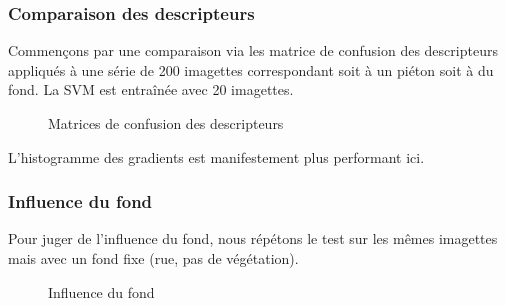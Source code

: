 \documentclass{article}
\begin{document}
	\subsubsection{Comparaison des  descripteurs}	
	\label{sec:desccomp}
	Commençons par une comparaison via les matrice de confusion des descripteurs appliqués à une série de 200 imagettes correspondant soit à un piéton soit à du fond. La SVM est entraînée avec 20 imagettes.
	
	\begin{figure}[h]
		\centering
		\hfill
		\caption{Matrices de confusion des descripteurs}
	\end{figure}
	
	L'histogramme des gradients est manifestement plus performant ici.
	
	\subsubsection{Influence du fond}
	Pour juger de l'influence du fond, nous répétons le test sur les mêmes imagettes mais avec un fond fixe (rue, pas de végétation).
	
	\begin{figure}[h]
		\centering
		\hfill
		\caption{Influence du fond}
	\end{figure}
\end{document}

